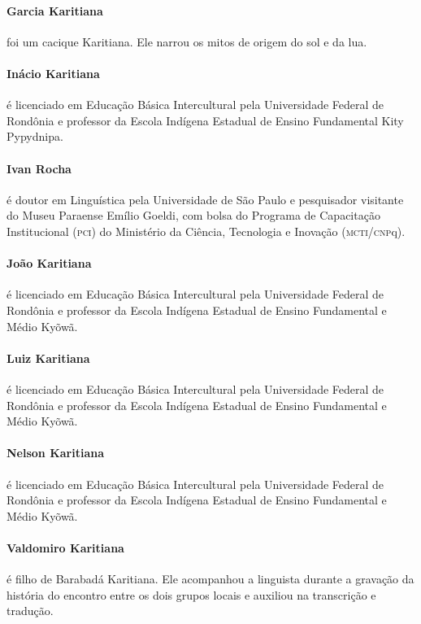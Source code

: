  \paragraph{Garcia Karitiana} foi um cacique Karitiana. Ele narrou os mitos de origem
 do sol e da lua.

 \paragraph{Inácio Karitiana} é licenciado em Educação Básica Intercultural pela
 Universidade Federal de Rondônia e professor da Escola Indígena Estadual
 de Ensino Fundamental Kity Pypydnipa.

 \paragraph{Ivan Rocha} é doutor em Linguística pela Universidade de São Paulo e
 pesquisador visitante do Museu Paraense Emílio Goeldi, com bolsa do
 Programa de Capacitação Institucional (\textsc{pci}) do Ministério da Ciência,
 Tecnologia e Inovação (\textsc{mcti}/\textsc{cnp}q).

 \paragraph{João Karitiana} é licenciado em Educação Básica Intercultural pela
 Universidade Federal de Rondônia e professor da Escola Indígena Estadual
 de Ensino Fundamental e Médio Kyõwã.

 \paragraph{Luiz Karitiana} é licenciado em Educação Básica Intercultural pela
 Universidade Federal de Rondônia e professor da Escola Indígena Estadual
 de Ensino Fundamental e Médio Kyõwã.

 \paragraph{Nelson Karitiana} é licenciado em Educação Básica Intercultural pela
 Universidade Federal de Rondônia e professor da Escola Indígena Estadual
 de Ensino Fundamental e Médio Kyõwã.

 \paragraph{Valdomiro Karitiana} é filho de Barabadá Karitiana. Ele acompanhou a
 linguista durante a gravação da história do encontro entre os dois
 grupos locais e auxiliou na transcrição e tradução.

